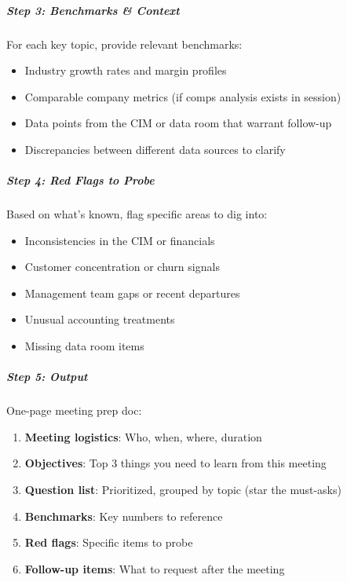 \documentclass[11pt]{article}
\begin{document}
\subparagraph{Step 3: Benchmarks \& Context}\mbox{}\par

For each key topic, provide relevant benchmarks:

\begin{itemize}[leftmargin=*,itemsep=2pt,topsep=2pt]
\item {} Industry growth rates and margin profiles
\item {} Comparable company metrics (if comps analysis exists in session)
\item {} Data points from the CIM or data room that warrant follow-up
\item {} Discrepancies between different data sources to clarify
\end{itemize}

\subparagraph{Step 4: Red Flags to Probe}\mbox{}\par

Based on what's known, flag specific areas to dig into:

\begin{itemize}[leftmargin=*,itemsep=2pt,topsep=2pt]
\item {} Inconsistencies in the CIM or financials
\item {} Customer concentration or churn signals
\item {} Management team gaps or recent departures
\item {} Unusual accounting treatments
\item {} Missing data room items
\end{itemize}

\subparagraph{Step 5: Output}\mbox{}\par

One-page meeting prep doc:

\begin{enumerate}[leftmargin=*,itemsep=2pt,topsep=2pt]
\item {} \textbf{Meeting logistics}: Who, when, where, duration
\item {} \textbf{Objectives}: Top 3 things you need to learn from this meeting
\item {} \textbf{Question list}: Prioritized, grouped by topic (star the must-asks)
\item {} \textbf{Benchmarks}: Key numbers to reference
\item {} \textbf{Red flags}: Specific items to probe
\item {} \textbf{Follow-up items}: What to request after the meeting
\end{enumerate}
\end{document}
